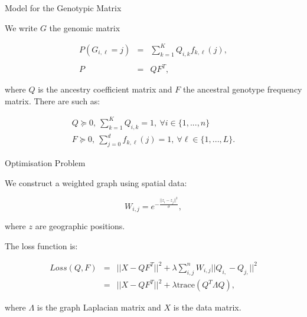\documentclass{beamer}\usepackage[]{graphicx}\usepackage[]{color}
\begin{document}
\begin{frame}{Model for the Genotypic Matrix}

We write $G$ the genomic matrix

\begin{equation*}
\begin{array}{rcl}
P(G_{i,\ell} = j) & = & \sum_{k=1}^K Q_{i,k} f_{k,\ell}(j),\\
\\
P &=& QF^T,
\end{array}
\end{equation*}

where $Q$ is the ancestry coefficient matrix and $F$ the ancestral genotype 
frequency matrix. There are such as: 

\begin{equation*}
\begin{aligned}
Q \succeq 0,~\sum_{k=1}^{K} Q_{i,k} = 1,~\forall i \in \{1,...,n\}  \\
F \succeq 0,~\sum_{j=0}^{d} f_{k,\ell}(j) = 1,~\forall \ell \in \{1,...,L\}.
\end{aligned}
\end{equation*}

\end{frame}


\begin{frame}{Optimisation Problem}

We construct a weighted graph using spatial data:

\begin{equation*}
W_{i,j} = e^{ - \frac{||z_i - z_j||^2}{\sigma}},
\end{equation*}

where $z$ are geographic positions.

The loss function is:

\begin{equation*}
\begin{aligned}
Loss(Q,F)& = &||X-QF^T||^2 + \lambda \sum_{i,j}^{n} W_{i,j} ||Q_{i,} - Q_{j,}||^2 \\
 &= &||X-QF^T||^2 + \lambda \text{trace}(Q^T \Lambda Q),
\end{aligned}
\end{equation*}

where $\Lambda$ is the graph Laplacian matrix and $X$ is the data matrix.

\end{frame}
\end{document}

